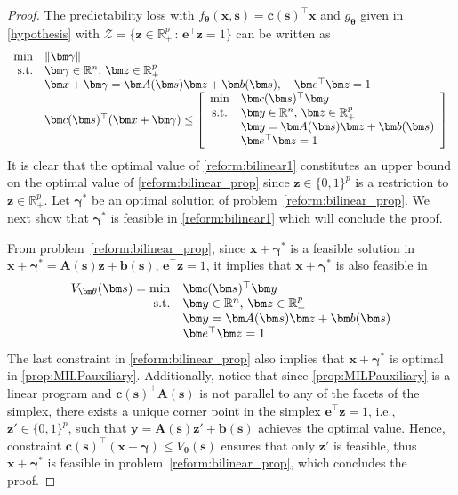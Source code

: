 \documentclass{article}
\theoremstyle{plain}
\begin{document}
\begin{proof}
The predictability loss with $f_{\bm\theta}(\bm x, \bm s) = \bm c(\bm s)^\top \bm x$ and $g_{\bm\theta}$ given in \eqref{hypothesis} with $\mathcal{Z} = \{\bm z\in\mathbb{R}^p_+\,:\,\bm e^\top \bm z = 1\}$ can be written as
    \begin{equation}\label{reform:bilinear_prop}
     \begin{array}{rl}
     \displaystyle\min  & \|\bm \gamma\|\\
   {\rm s.t.} & \bm \gamma\in\mathbb{R}^n,\, \bm z \in \mathbb{R}_+^p\\
&\bm x+\bm \gamma  = \bm A(\bm s)\bm z+\bm b(\bm s), \quad \bm e^\top \bm z = 1\\
&\bm c(\bm s)^\top(\bm x+\bm\gamma) \leq  \left[
    \begin{array}{cl}
\displaystyle\min  & \bm c(\bm s)^\top\bm y\\
{\rm s.t.}& \bm y\in\mathbb{R}^n,\, \bm z\in\mathbb{R}_+^p\\
&\bm y  = \bm A(\bm s)\bm z+\bm b(\bm s)\\
& \bm e^\top \bm z = 1
    \end{array}
    \right]
    \end{array}
\end{equation}
It is clear that the optimal value of \eqref{reform:bilinear1} constitutes an upper bound on the optimal value of \eqref{reform:bilinear_prop} since $\bm z \in \{0,1\}^p$ is a restriction to $\bm z \in \mathbb{R}_+^p$. Let $\bm \gamma^*$ be an optimal solution of problem~\eqref{reform:bilinear_prop}. We next show that $\bm \gamma^*$ is feasible in \eqref{reform:bilinear1} which will conclude the proof. 

From problem~\eqref{reform:bilinear_prop}, since  $\bm x+\bm \gamma^*$ is a feasible solution in $\bm x+\bm \gamma^*  = \bm A(\bm s)\bm z+\bm b(\bm s),\, \bm e^\top \bm z = 1$, it implies that $\bm x+\bm \gamma^*$ is also feasible in 
\begin{equation}\label{prop:MILPauxiliary}
        \begin{array}{rl}
\displaystyle V_{\bm\theta}(\bm s)=\min  & \bm c(\bm s)^\top\bm y\\
{\rm s.t.}& \bm y\in\mathbb{R}^n,\, \bm z\in\mathbb{R}_+^p\\
&\bm y  = \bm A(\bm s)\bm z+\bm b(\bm s)\\
& \bm e^\top \bm z = 1
    \end{array}
\end{equation}
The last constraint in \eqref{reform:bilinear_prop} also implies that $\bm x+\bm \gamma^*$ is optimal in \eqref{prop:MILPauxiliary}. Additionally, notice that since \eqref{prop:MILPauxiliary} is a linear program and $\bm c(\bm s)^\top\bm A(\bm s)$ is not parallel to any of the facets of the simplex, there exists a unique corner point in the simplex $\bm e^\top \bm z = 1$, i.e.,  $\bm z' \in \{0,1\}^p$, such that $\bm y = \bm A(\bm s)\bm z'+\bm b(\bm s)$   achieves the optimal value. Hence, constraint  $\bm c(\bm s)^\top(\bm x+\bm\gamma) \leq V_{\bm\theta}(\bm s)$ ensures that only $\bm z'$ is feasible, thus   $\bm x+\bm \gamma^*$ is feasible in problem~\eqref{reform:bilinear_prop}, which concludes the proof.
\end{proof}
\end{document}
